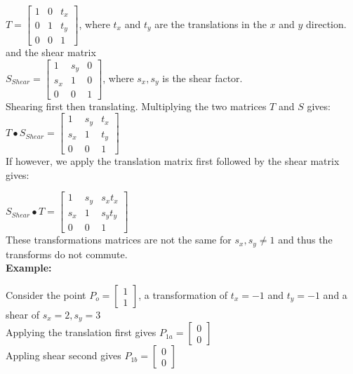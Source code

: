 \documentclass[a4paper,10pt]{scrartcl}
\begin{document}
$T = 
\begin{bmatrix}
    1       & 0 & t_x \\
    0       & 1 & t_y \\
    0       & 0 & 1 
\end{bmatrix}
$, where $t_x $ and $t_y$ are the translations in the $x$ and $y$ direction. \\

and the shear matrix \\

$S_{Shear} = \begin{bmatrix}
    1       & s_y & 0 \\
    s_x       & 1 & 0 \\
    0       & 0 & 1     
 \end{bmatrix}
$, where $s_x, s_y$ is the shear factor. \\

Shearing first then translating. Multiplying the two matrices $T$ and $S$ gives: \\

$T \bullet S_{Shear} = \begin{bmatrix}
		  1 & s_y & t_x \\
		  s_x & 1 & t_y \\
		  0 & 0 & 1
               \end{bmatrix}
$ \\

If however, we apply the translation matrix first followed by the shear matrix gives:

$S_{Shear} \bullet T = \begin{bmatrix}
		  1 & s_y & s_xt_x \\
		  s_x & 1 & s_yt_y \\
		  0 & 0 & 1
               \end{bmatrix}
$ \\

These transformations matrices are not the same for $s_x, s_y \neq 1$ and thus the transforms do not commute. \\ 


{\bfseries{Example:}}

Consider the point $P_o = \begin{bmatrix} 1 \\ 1 \end{bmatrix}$, a transformation of $t_x = -1$ and $t_y = -1$ and a shear of $s_x = 2, s_y = 3$\\
Applying the translation first gives $P_{1a} = \begin{bmatrix} 0 \\ 0 \end{bmatrix}$ \\ 
Appling shear second gives $P_{1b} = \begin{bmatrix} 0 \\ 0 \end{bmatrix}$
\end{document}
